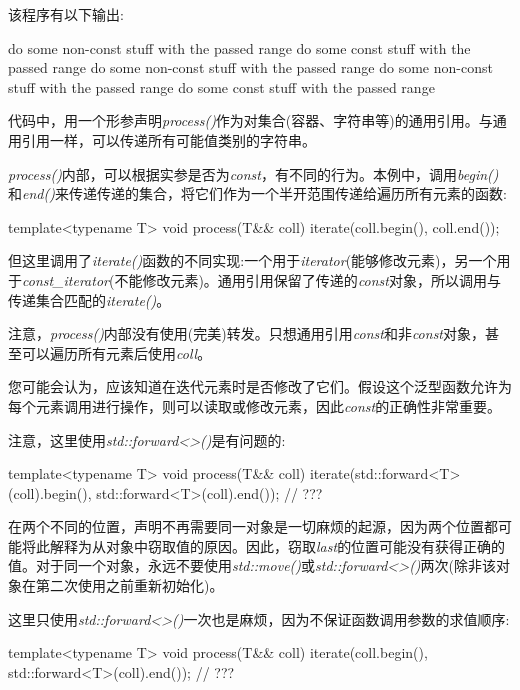 该程序有以下输出:

\begin{outputcode}
do some non-const stuff with the passed range
do some const stuff with the passed range
do some non-const stuff with the passed range
do some non-const stuff with the passed range
do some const stuff with the passed range
\end{outputcode}

代码中，用一个形参声明\textit{process()}作为对集合(容器、字符串等)的通用引用。与通用引用一样，可以传递所有可能值类别的字符串。

\textit{process()}内部，可以根据实参是否为\textit{const}，有不同的行为。本例中，调用\textit{begin()}和\textit{end()}来传递传递的集合，将它们作为一个半开范围传递给遍历所有元素的函数:

\begin{cppcode}
template<typename T>
void process(T&& coll)
{
	iterate(coll.begin(), coll.end());
}
\end{cppcode}

但这里调用了\textit{iterate()}函数的不同实现:一个用于\textit{iterator}(能够修改元素)，另一个用于\textit{const_iterator}(不能修改元素)。通用引用保留了传递的\textit{const}对象，所以调用与传递集合匹配的\textit{iterate()}。

注意，\textit{process()}内部没有使用(完美)转发。只想通用引用\textit{const}和非\textit{const}对象，甚至可以遍历所有元素后使用\textit{coll}。

您可能会认为，应该知道在迭代元素时是否修改了它们。假设这个泛型函数允许为每个元素调用进行操作，则可以读取或修改元素，因此\textit{const}的正确性非常重要。

注意，这里使用\textit{std::forward<>()}是有问题的:

\begin{cppcode}
template<typename T>
void process(T&& coll)
{
	iterate(std::forward<T>(coll).begin(), std::forward<T>(coll).end()); // ???
}
\end{cppcode}

在两个不同的位置，声明不再需要同一对象是一切麻烦的起源，因为两个位置都可能将此解释为从对象中窃取值的原因。因此，窃取\textit{last}的位置可能没有获得正确的值。对于同一个对象，永远不要使用\textit{std::move()}或\textit{std::forward<>()}两次(除非该对象在第二次使用之前重新初始化)。

这里只使用\textit{std::forward<>()}一次也是麻烦，因为不保证函数调用参数的求值顺序:

\begin{cppcode}
template<typename T>
void process(T&& coll)
{
	iterate(coll.begin(), std::forward<T>(coll).end()); // ???
}
\end{cppcode}

